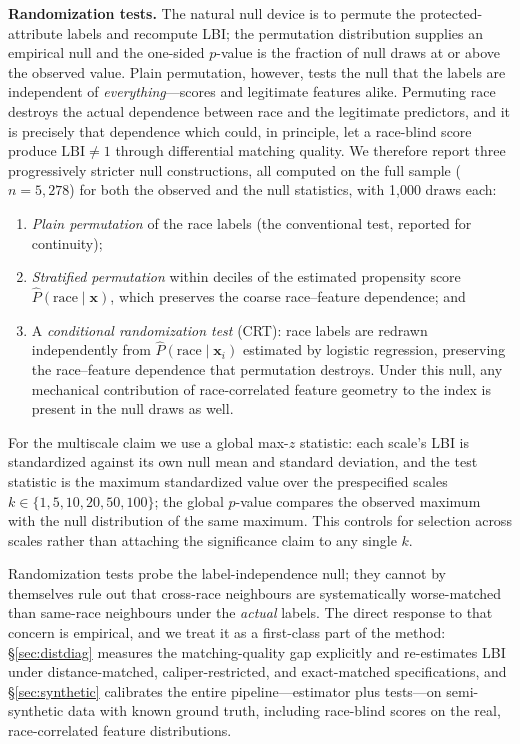 \documentclass[11pt]{article}
\begin{document}
\textbf{Randomization tests.} The natural null device is to permute
the protected-attribute labels and recompute LBI; the permutation
distribution supplies an empirical null and the one-sided $p$-value is
the fraction of null draws at or above the observed value. Plain
permutation, however, tests the null that the labels are independent
of \emph{everything}---scores and legitimate features alike. Permuting
race destroys the actual dependence between race and the legitimate
predictors, and it is precisely that dependence which could, in
principle, let a race-blind score produce $\mathrm{LBI} \neq 1$
through differential matching quality. We therefore report three
progressively stricter null constructions, all computed on the full
sample ($n = 5{,}278$) for both the observed and the null statistics,
with 1{,}000 draws each:
\begin{enumerate}[leftmargin=*]
\item \emph{Plain permutation} of the race labels (the conventional
test, reported for continuity);
\item \emph{Stratified permutation} within deciles of the estimated
propensity score $\hat{P}(\text{race} \mid \mathbf{x})$, which
preserves the coarse race--feature dependence; and
\item A \emph{conditional randomization test} (CRT): race labels are
redrawn independently from $\hat{P}(\text{race} \mid \mathbf{x}_i)$
estimated by logistic regression, preserving the race--feature
dependence that permutation destroys. Under this null, any
mechanical contribution of race-correlated feature geometry to the
index is present in the null draws as well.
\end{enumerate}
For the multiscale claim we use a global max-$z$ statistic: each
scale's LBI is standardized against its own null mean and standard
deviation, and the test statistic is the maximum standardized value
over the prespecified scales $k \in \{1, 5, 10, 20, 50, 100\}$; the
global $p$-value compares the observed maximum with the null
distribution of the same maximum. This controls for selection across
scales rather than attaching the significance claim to any single
$k$.

Randomization tests probe the label-independence null; they cannot by
themselves rule out that cross-race neighbours are systematically
worse-matched than same-race neighbours under the \emph{actual}
labels. The direct response to that concern is empirical, and we
treat it as a first-class part of the method: \S\ref{sec:distdiag}
measures the matching-quality gap explicitly and re-estimates LBI
under distance-matched, caliper-restricted, and exact-matched
specifications, and \S\ref{sec:synthetic} calibrates the entire
pipeline---estimator plus tests---on semi-synthetic data with known
ground truth, including race-blind scores on the real,
race-correlated feature distributions.
\end{document}

